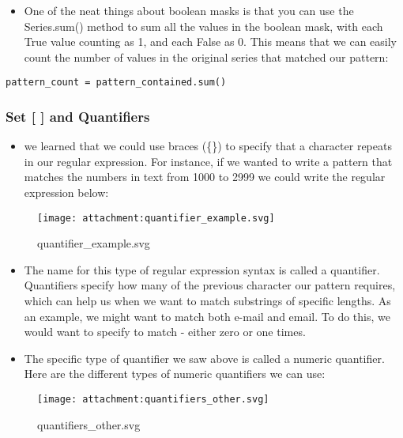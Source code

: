 \documentclass[11pt]{article}
\providecommand{\tightlist}{%
      \setlength{\itemsep}{0pt}\setlength{\parskip}{0pt}}
\begin{document}
\begin{itemize}
\tightlist
\item
  One of the neat things about boolean masks is that you can use the
  Series.sum() method to sum all the values in the boolean mask, with
  each True value counting as 1, and each False as 0. This means that we
  can easily count the number of values in the original series that
  matched our pattern:
\end{itemize}

\begin{verbatim}
pattern_count = pattern_contained.sum()
\end{verbatim}

\hypertarget{set-and-quantifiers}{%
\subsubsection{Set {[} {]} and Quantifiers}\label{set-and-quantifiers}}

\begin{itemize}
\tightlist
\item
  we learned that we could use braces (\{\}) to specify that a character
  repeats in our regular expression. For instance, if we wanted to write
  a pattern that matches the numbers in text from 1000 to 2999 we could
  write the regular expression below:
\end{itemize}

\begin{figure}
\centering
\texttt{[image: attachment:quantifier\_example.svg]}
\caption{quantifier\_example.svg}
\end{figure}

\begin{itemize}
\item
  The name for this type of regular expression syntax is called a
  quantifier. Quantifiers specify how many of the previous character our
  pattern requires, which can help us when we want to match substrings
  of specific lengths. As an example, we might want to match both e-mail
  and email. To do this, we would want to specify to match - either zero
  or one times.
\item
  The specific type of quantifier we saw above is called a numeric
  quantifier. Here are the different types of numeric quantifiers we can
  use:
\end{itemize}

\begin{figure}
\centering
\texttt{[image: attachment:quantifiers\_other.svg]}
\caption{quantifiers\_other.svg}
\end{figure}
\end{document}
